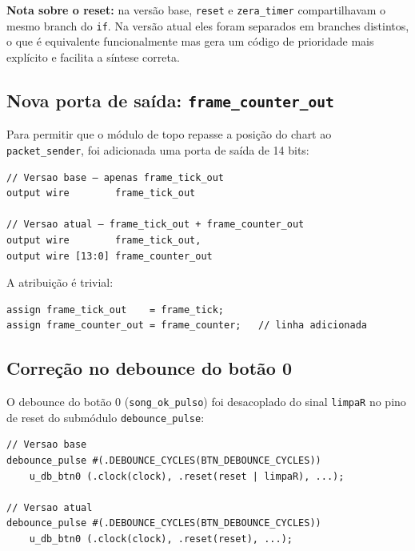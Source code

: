 \documentclass[12pt, a4paper]{article}
\newcommand{\vsig}[1]{\texttt{#1}}
\begin{document}
\begin{destaque}
\textbf{Nota sobre o reset:} na versão base, \texttt{reset} e \texttt{zera\_timer}
compartilhavam o mesmo branch do \texttt{if}. Na versão atual eles foram separados
em branches distintos, o que é equivalente funcionalmente mas gera um código de
prioridade mais explícito e facilita a síntese correta.
\end{destaque}

\subsection{Nova porta de saída: \texttt{frame\_counter\_out}}

Para permitir que o módulo de topo repasse a posição do chart ao
\texttt{packet\_sender}, foi adicionada uma porta de saída de 14 bits:

\begin{lstlisting}[caption={Nova porta de saída em fluxo\_dados}]
// Versao base — apenas frame_tick_out
output wire        frame_tick_out

// Versao atual — frame_tick_out + frame_counter_out
output wire        frame_tick_out,
output wire [13:0] frame_counter_out
\end{lstlisting}

A atribuição é trivial:

\begin{lstlisting}
assign frame_tick_out    = frame_tick;
assign frame_counter_out = frame_counter;   // linha adicionada
\end{lstlisting}

\subsection{Correção no debounce do botão 0}

O debounce do botão 0 (\vsig{song\_ok\_pulso}) foi desacoplado do sinal
\vsig{limpaR} no pino de reset do submódulo \texttt{debounce\_pulse}:

\begin{lstlisting}[caption={Reset do debounce — botão 0}]
// Versao base
debounce_pulse #(.DEBOUNCE_CYCLES(BTN_DEBOUNCE_CYCLES))
    u_db_btn0 (.clock(clock), .reset(reset | limpaR), ...);

// Versao atual
debounce_pulse #(.DEBOUNCE_CYCLES(BTN_DEBOUNCE_CYCLES))
    u_db_btn0 (.clock(clock), .reset(reset), ...);
\end{lstlisting}
\end{document}
